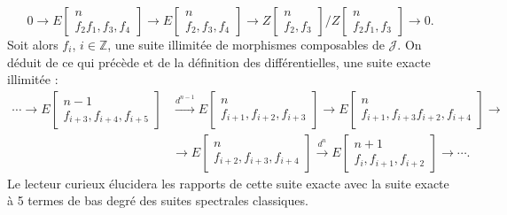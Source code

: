 \clearpage
{}%
\begingroup\small\setlength{\parskip}{0pt}\setlength{\emergencystretch}{2.5em}
\[
0\longrightarrow
E\!\begin{bmatrix}n\\ f_2f_1,f_3,f_4\end{bmatrix}
\longrightarrow
E\!\begin{bmatrix}n\\ f_2,f_3,f_4\end{bmatrix}
\longrightarrow
Z\!\begin{bmatrix}n\\ f_2,f_3\end{bmatrix}
 \Big/
Z\!\begin{bmatrix}n\\ f_2f_1,f_3\end{bmatrix}
\longrightarrow0.
\]
Soit alors $f_i$, $i\in\mathbb Z$, une suite illimitée de morphismes
composables de $\mathcal J$. On déduit de ce qui précède et de la définition
des différentielles, une suite exacte illimitée :
\[
\begin{aligned}
\cdots\longrightarrow
E\!\begin{bmatrix}n-1\\ f_{i+3},f_{i+4},f_{i+5}\end{bmatrix}
&\xrightarrow{d^{n-1}}
E\!\begin{bmatrix}n\\ f_{i+1},f_{i+2},f_{i+3}\end{bmatrix}
\longrightarrow
E\!\begin{bmatrix}n\\ f_{i+1},f_{i+3}f_{i+2},f_{i+4}\end{bmatrix}
\longrightarrow{}\\[-1pt]
&\longrightarrow
E\!\begin{bmatrix}n\\ f_{i+2},f_{i+3},f_{i+4}\end{bmatrix}
\xrightarrow{d^n}
E\!\begin{bmatrix}n+1\\ f_i,f_{i+1},f_{i+2}\end{bmatrix}
\longrightarrow\cdots.
\end{aligned}
\]
Le lecteur curieux élucidera les rapports de cette suite exacte avec la
suite exacte à 5 termes de bas degré des suites spectrales classiques.

